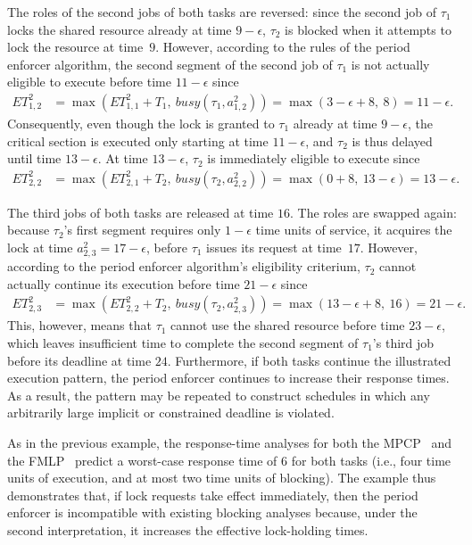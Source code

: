 The roles of the second jobs of both tasks are reversed: since the second job of $\tau_1$ locks the shared resource already at time $9-\epsilon$, $\tau_2$ is blocked when it attempts to lock the resource at time~$9$. However, according to the rules of the period enforcer algorithm, the second segment of the second job of $\tau_1$ is not actually eligible to execute before time $11 - \epsilon$ since
\begin{align*}
	ET_{1,2}^2 & = \max\left(ET_{1,1}^2 + T_1,\ \mathit{busy}(\tau_1, a^2_{1,2})\right) =\max(3 - \epsilon + 8,\ 8) = 11 - \epsilon.
\end{align*}
Consequently, even though the lock is granted to $\tau_1$ already  at time $9-\epsilon$, the critical section is executed only starting at time $11 - \epsilon$, and $\tau_2$ is thus delayed until time $13 - \epsilon$. At time $13 - \epsilon$, $\tau_2$ is immediately eligible to execute since
\begin{align*}
	ET_{2,2}^2 & = \max\left(ET_{2,1}^2 + T_2,\ \mathit{busy}(\tau_2, a^2_{2,2})\right) =\max(0 + 8,\ 13 - \epsilon) = 13 - \epsilon.
\end{align*}

The third jobs of both tasks are released at time $16$. The roles are swapped again: because $\tau_2$'s first segment requires only $1-\epsilon$ time units of service, it acquires the lock at time $a^2_{2,3} = 17 - \epsilon$, before $\tau_1$ issues its request at time~$17$. However, according to the period enforcer algorithm's eligibility criterium, $\tau_2$ cannot actually continue its execution before time $21- \epsilon$ since
\begin{align*}
	ET_{2,3}^2 & = \max\left(ET_{2,2}^2 + T_2,\ \mathit{busy}(\tau_2, a^2_{2,3})\right) =\max(13- \epsilon + 8,\ 16) = 21- \epsilon.
\end{align*}
This, however, means that $\tau_1$ cannot use the shared resource before time $23 - \epsilon$, which leaves insufficient time to complete the second segment of $\tau_1$'s third job before its deadline at time $24$.
Furthermore, if both tasks continue the illustrated execution pattern, the period enforcer continues to increase their response times. As a result, the pattern may be repeated to construct schedules in which any arbitrarily large implicit or constrained deadline is violated.

As in the previous example,  the response-time analyses for both the MPCP~\cite{Br:13,LNR:09} and the   FMLP~\cite{Br:13} predict a worst-case response time of $6$ for both tasks (i.e., four time units of execution, and at most two time units of blocking). The example thus demonstrates that, if lock requests take effect immediately, then the period enforcer is incompatible with existing blocking analyses because, under the second interpretation, it increases the effective lock-holding times.


